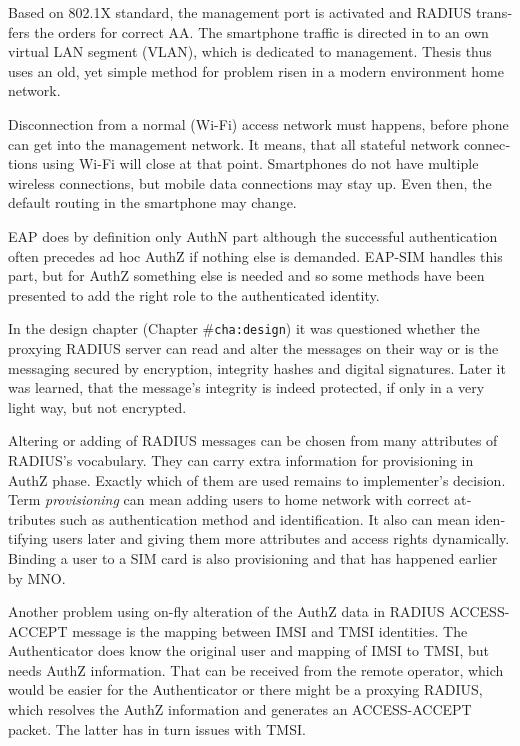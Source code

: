 \documentclass[12pt,a4paper,english]{tutthesis}
\begin{document}
\begin{otherlanguage}{english}
Based on 802.1X standard, the management port is activated and
RADIUS transfers the orders for correct AA.
The smartphone traffic is directed in to an own virtual LAN segment (VLAN),
which is dedicated to management.
Thesis thus uses an old, yet simple method for problem risen in a modern environment home network.

Disconnection from a normal (Wi-Fi) access network must happens, before phone can get
into the management network. It means, that all stateful network
connections using Wi-Fi will close at that point. Smartphones do not
have multiple wireless connections, but mobile data connections may 
stay up. Even then, the default routing in the smartphone may change.


EAP does by definition only AuthN part although the successful
authentication often precedes ad hoc AuthZ if nothing else is demanded.
EAP-SIM handles this part, but for AuthZ something else is needed
and so some methods have been presented to add the right role to 
the authenticated identity.



In the design chapter (Chapter \#\texttt{cha:design}) it was questioned whether the proxying RADIUS server
can read and alter the messages on their way or is the messaging secured
by encryption, integrity hashes and digital signatures.
Later it was learned, that the message's integrity is indeed protected, if
only in a very light way, but not encrypted.

Altering or adding of  RADIUS messages can be chosen from many
attributes of RADIUS's vocabulary. They can carry extra information
for provisioning in AuthZ phase. Exactly which of them are used
remains to implementer's  decision. 
Term \emph{provisioning} can mean adding users to home network with correct
attributes such as authentication method and identification.
It also can mean identifying users later and giving
them more attributes and access rights dynamically.
Binding a user to a SIM card is also provisioning and that has
happened earlier by MNO.













Another problem using on-fly alteration of the AuthZ data in RADIUS ACCESS-ACCEPT message
is the mapping between IMSI and TMSI identities.
The Authenticator does know the original user and mapping of IMSI to
TMSI, but needs AuthZ information. That can be received from the
remote operator, which would be easier for the
Authenticator or there might be a proxying RADIUS, which resolves the
AuthZ information and generates an ACCESS-ACCEPT packet. The latter
has in turn issues with TMSI.


\end{otherlanguage}
\end{document}
